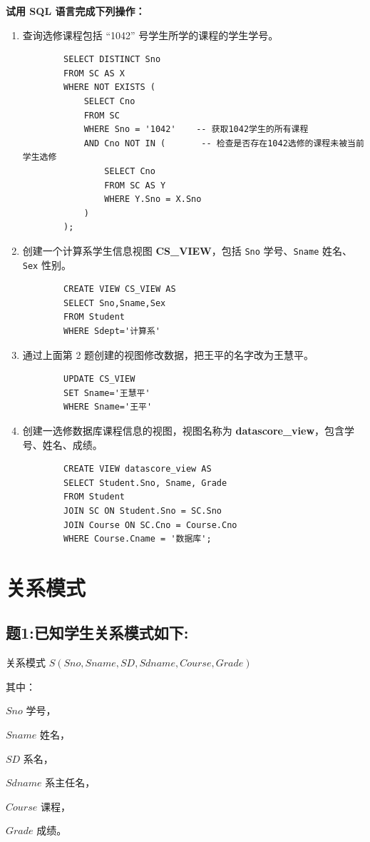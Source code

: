 \documentclass[a4paper,12pt,UTF8]{ctexart}
\begin{document}
\textbf{试用 SQL 语言完成下列操作：}

\begin{enumerate}
    \item 查询选修课程包括 “1042” 号学生所学的课程的学生学号。\\
    \begin{lstlisting}
        SELECT DISTINCT Sno
        FROM SC AS X
        WHERE NOT EXISTS (
            SELECT Cno
            FROM SC
            WHERE Sno = '1042'    -- 获取1042学生的所有课程
            AND Cno NOT IN (       -- 检查是否存在1042选修的课程未被当前学生选修
                SELECT Cno
                FROM SC AS Y
                WHERE Y.Sno = X.Sno
            )
        );
    \end{lstlisting}
    \item 创建一个计算系学生信息视图 \textbf{CS\_VIEW}，包括 \texttt{Sno} 学号、\texttt{Sname} 姓名、\texttt{Sex} 性别。
    \begin{lstlisting}
        CREATE VIEW CS_VIEW AS
        SELECT Sno,Sname,Sex
        FROM Student
        WHERE Sdept='计算系'
    \end{lstlisting}
    \item 通过上面第 2 题创建的视图修改数据，把王平的名字改为王慧平。
    \begin{lstlisting}
        UPDATE CS_VIEW
        SET Sname='王慧平'
        WHERE Sname='王平'
    \end{lstlisting}
    \item 创建一选修数据库课程信息的视图，视图名称为 \textbf{datascore\_view}，包含学号、姓名、成绩。
    \begin{lstlisting}
        CREATE VIEW datascore_view AS
        SELECT Student.Sno, Sname, Grade
        FROM Student
        JOIN SC ON Student.Sno = SC.Sno
        JOIN Course ON SC.Cno = Course.Cno
        WHERE Course.Cname = '数据库';
    \end{lstlisting}
\end{enumerate}

\section{关系模式}
\subsection{题1:已知学生关系模式如下:}
\par 关系模式 $S(Sno, Sname, SD, Sdname, Course, Grade)$

其中：\par  
$Sno$ 学号，  \par
$Sname$ 姓名，  \par
$SD$ 系名，  \par
$Sdname$ 系主任名，\par
$Course$ 课程，  \par
$Grade$ 成绩。  
\end{document}
